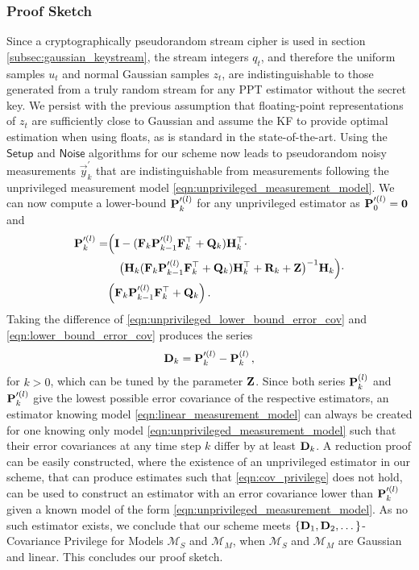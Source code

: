 \documentclass[letterpaper, 10 pt, conference]{ieeeconf}
\begin{document}
\subsubsection*{Proof Sketch}
Since a cryptographically pseudorandom stream cipher is used in section \ref{subsec:gaussian_keystream}, the stream integers $q_t$, and therefore the uniform samples $u_t$ and normal Gaussian samples $z_t$, are indistinguishable to those generated from a truly random stream for any PPT estimator without the secret key. We persist with the previous assumption that floating-point representations of $z_t$ are sufficiently close to Gaussian and assume the KF to provide optimal estimation when using floats, as is standard in the state-of-the-art. Using the $\mathsf{Setup}$ and $\mathsf{Noise}$ algorithms for our scheme now leads to pseudorandom noisy measurements $\vec{y}^\prime_k$ that are indistinguishable from measurements following the unprivileged measurement model \eqref{eqn:unprivileged_measurement_model}. We can now compute a lower-bound ${{\mathbf{P}}}_k^{\prime(l)}$ for any unprivileged estimator as ${{\mathbf{P}}}_0^{\prime(l)}={{\mathbf{0}}}$ and
\begin{equation}\label{eqn:unprivileged_lower_bound_error_cov}
   \begin{split}
      {\ensuremath{{\mathbf{P}}}}_k^{\prime(l)} =& \Bigl( {{\mathbf{I}}} - ({{\mathbf{F}}}_k{{\mathbf{P}}}_{k-1}^{\prime(l)}{{\mathbf{F}}}_k^\top + {{\mathbf{Q}}}_k){{\mathbf{H}}}_k^\top \cdot \\
      &\quad\bigl({{\mathbf{H}}}_k({{\mathbf{F}}}_k{{\mathbf{P}}}_{k-1}^{\prime(l)}{{\mathbf{F}}}_k^\top + {{\mathbf{Q}}}_k){{\mathbf{H}}}_k^\top + {{\mathbf{R}}}_k+{{\mathbf{Z}}}\bigr)^{-1}{{\mathbf{H}}}_k\Bigr)\cdot\\
      &\Bigl({{\mathbf{F}}}_k{{\mathbf{P}}}_{k-1}^{\prime(l)}{{\mathbf{F}}}_k^\top + {{\mathbf{Q}}}_k\Bigr)\,.
   \end{split}
\end{equation}
Taking the difference of \eqref{eqn:unprivileged_lower_bound_error_cov} and \eqref{eqn:lower_bound_error_cov} produces the series
\begin{equation}\label{eqn:covariance_difference_series}
   {\ensuremath{{\mathbf{D}}}}_k = {{\mathbf{P}}}_k^{\prime(l)} - {{\mathbf{P}}}_k^{(l)}\,,
\end{equation}
for $k>0$, which can be tuned by the parameter ${{\mathbf{Z}}}$. Since both series ${{\mathbf{P}}}_k^{(l)}$ and ${{\mathbf{P}}}_k^{\prime(l)}$ give the lowest possible error covariance of the respective estimators, an estimator knowing model \eqref{eqn:linear_measurement_model} can always be created for one knowing only model \eqref{eqn:unprivileged_measurement_model} such that their error covariances at any time step $k$ differ by at least ${{\mathbf{D}}}_k$. A reduction proof can be easily constructed, where the existence of an unprivileged estimator in our scheme, that can produce estimates such that \eqref{eqn:cov_privilege} does not hold, can be used to construct an estimator with an error covariance lower than ${{\mathbf{P}}}_k^{\prime(l)}$ given a known model of the form \eqref{eqn:unprivileged_measurement_model}. As no such estimator exists, we conclude that our scheme meets $\{{{\mathbf{D}}}_1,{{\mathbf{D}}}_2,\dots\}$-Covariance Privilege for Models $\mathcal{M}_S$ and $\mathcal{M}_M$, when $\mathcal{M}_S$ and $\mathcal{M}_M$ are Gaussian and linear. This concludes our proof sketch.
\end{document}
